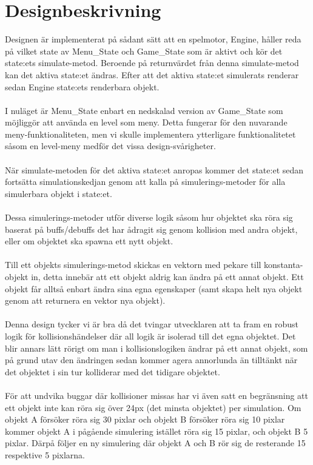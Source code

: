 \documentclass{TDP003mall}
\begin{document}
\section{Designbeskrivning}
Designen är implementerat på sådant sätt att en spelmotor, Engine, håller reda på vilket state av Menu\_State och Game\_State som är aktivt och kör det state:ets simulate-metod. Beroende på returnvärdet från denna simulate-metod kan det aktiva state:et ändras. Efter att det aktiva state:et simulerats renderar sedan Engine state:ets renderbara objekt.
\\\\
I nuläget är Menu\_State enbart en nedskalad version av Game\_State som möjliggör att använda en level som meny. Detta fungerar för den nuvarande meny-funktionaliteten, men vi skulle implementera ytterligare funktionalitetet såsom en level-meny medför det vissa design-svårigheter.
\\\\
När simulate-metoden för det aktiva state:et anropas kommer det state:et sedan fortsätta simulationskedjan genom att kalla på simulerings-metoder för alla simulerbara objekt i state:et.
\\\\
Dessa simulerings-metoder utför diverse logik såsom hur objektet ska röra sig baserat på buffs/debuffs det har ådragit sig genom kollision med andra objekt, eller om objektet ska spawna ett nytt objekt.
\\\\
Till ett objekts simulerings-metod skickas en vektorn med pekare till konstanta-objekt in, detta innebär att ett objekt aldrig kan ändra på ett annat objekt. Ett objekt får alltså enbart ändra sina egna egenskaper (samt skapa helt nya objekt genom att returnera en vektor nya objekt).
\\\\
Denna design tycker vi är bra då det tvingar utvecklaren att ta fram en robust logik för kollisionshändelser där all logik är isolerad till det egna objektet. Det blir annars lätt rörigt om man i kollisionslogiken ändrar på ett annat objekt, som på grund utav den ändringen sedan kommer agera annorlunda än tilltänkt när det objektet i sin tur kolliderar med det tidigare objektet.
\\\\
För att undvika buggar där kollisioner missas har vi även satt en begränsning att ett objekt inte kan röra sig över 24px (det minsta objektet) per simulation. Om objekt A försöker röra sig 30 pixlar och objekt B försöker röra sig 10 pixlar kommer objekt A i pågående simulering istället röra sig 15 pixlar, och objekt B 5 pixlar. Därpå följer en ny simulering där objekt A och B rör sig de resterande 15 respektive 5 pixlarna.
\end{document}
